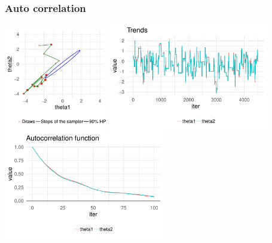 \documentclass[10pt]{beamer}
\begin{document}
\begin{frame}

\frametitle{ Auto correlation}

  \vspace{-0.5\baselineskip}
  \includegraphics[width=4.5cm]{figs/Metrop3.pdf}
  {\includegraphics[width=7cm]{figs/Metrop3trace.pdf}\\}
  {\includegraphics[width=7cm]{figs/Metrop3acf.pdf}}

\end{frame}
\end{document}
